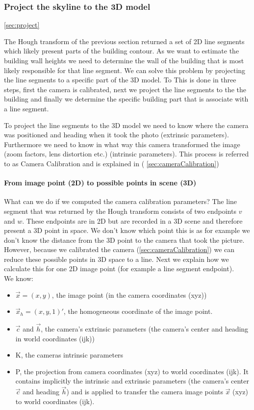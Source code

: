 \subsubsection{Project the skyline to the 3D model}
\ref{sec:project}

	The Hough transform of the previous section returned a set of 2D line
	segments which likely present parts of the building contour.  
	As we want to estimate the building wall heights we need to determine the wall
	of the building that is most likely responsible for that line segment.
	We can solve this problem by projecting the line segments to a specific
	part of the 3D model. To 
	This is done in three steps, first the camera is calibrated, next we
	project the line segments to the the building and finally we 
	determine the specific building part that is associate with a line segment.


	To project the line segments to the 3D model we need to know where the
	camera was positioned and heading when it took the photo (extrinsic
	parameters). Furthermore we need to know in what way this camera transformed
	the image (zoom factors, lens distortion etc.) (intrinsic parameters).
	This process is referred to as Camera Calibration and is explained in (
	\ref{sec:cameraCalibration})
	 
	\paragraph{From image point (2D) to possible points in scene (3D)} 

	What can we do if we computed the camera calibration parameters?
	The line segment that was returned by the Hough transform consists of two
	endpoints $v$ and $w$. These endpoints are in 2D but are recorded in a 3D
	scene and therefore present a 3D point in space. We don't know which point
	this is as for example we don't know the distance from the 3D point to the camera that took
	the picture. 
	However, because we calibrated the camera (\ref{sec:cameraCalibration}) we
	can reduce these possible points in 3D space to a line. Next we explain how
	we calculate this for one 2D image point (for example a line segment endpoint).\\

	We know:
	\begin{itemize}
		\item $\vec{x} = (x,y)$, the image point (in the camera coordinates
		(xyz))
		\item $\vec{x}_{h} = (x,y,1)'$, the homogeneous coordinate of the image point.
		\item $\vec{c}$ and $\vec{h}$, the camera's extrinsic parameters (the
		camera's center and heading in world coordinates (ijk))
		\item K, the cameras intrinsic parameters
		\item P, the projection from camera coordinates (xyz) to world
		coordinates (ijk). It contains implicitly the intrinsic and
		extrinsic parameters (the camera's center $\vec{c}$ and heading
		$\vec{h}$) and is applied to transfer the camera image points $\vec{x}$ (xyz) to world
		coordinates (ijk).
	\end{itemize}

